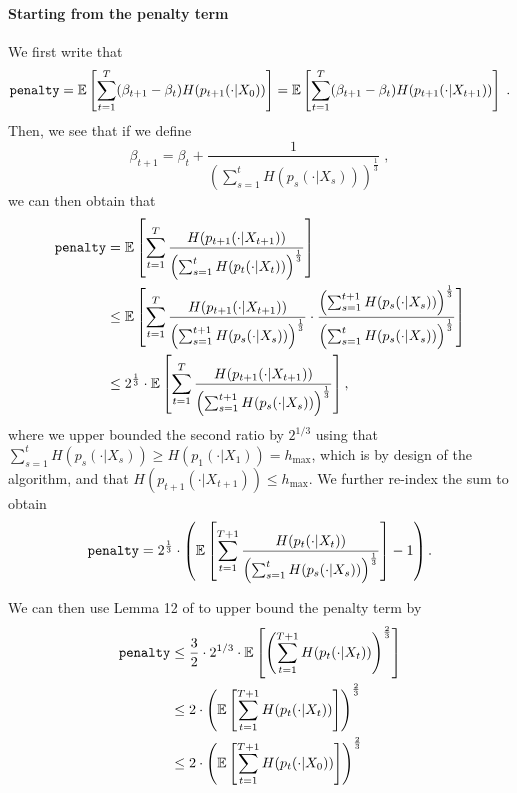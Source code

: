 \paragraph{Starting from the penalty term} We first write that 
\[ \texttt{penalty} =  \mathbb{E}\left[\sum_{t=1}^T (\beta_{t+1}-\beta_t) H(p_{t+1}(\cdot|X_0))\right] = \mathbb{E}\left[\sum_{t=1}^T (\beta_{t+1}-\beta_t) H(p_{t+1}(\cdot|X_{t+1}))\right] \;. \]
Then, we see that if we define
\[\beta_{t+1} = \beta_t + \frac{1}{\left(\sum_{s=1}^{t}H(p_s(\cdot|X_s))\right)^{\frac{1}{3}}} \;, \]
we can then obtain that 
\begin{align*}
\texttt{penalty} &= \mathbb{E}\left[\sum_{t=1}^T \frac{H(p_{t+1}(\cdot|X_{t+1}))}{\left(\sum_{s=1}^{t}H(p_t(\cdot|X_t))\right)^{\frac{1}{3}}}  \right]  \\
& \leq \mathbb{E}\left[\sum_{t=1}^T \frac{H(p_{t+1}(\cdot|X_{t+1}))}{\left(\sum_{s=1}^{t+1}H(p_s(\cdot|X_s))\right)^{\frac{1}{3}}} \cdot \frac{\left(\sum_{s=1}^{t+1}H(p_s(\cdot|X_s))\right)^{\frac{1}{3}}}{\left(\sum_{s=1}^{t}H(p_s(\cdot|X_s))\right)^{\frac{1}{3}}}  \right] \\
& \leq 2^\frac{1}{3} \cdot \mathbb{E}\left[\sum_{t=1}^T \frac{H(p_{t+1}(\cdot|X_{t+1}))}{\left(\sum_{s=1}^{t+1}H(p_s(\cdot|X_s))\right)^{\frac{1}{3}}}\right],  \\
\end{align*}
where we upper bounded the second ratio by $2^{1/3}$ using that $\sum_{s=1}^t H(p_s(\cdot|X_s))\geq H(p_1(\cdot|X_1))=h_{\max}$, which is by design of the algorithm, and that $H(p_{t+1}(\cdot|X_{t+1}))\leq h_{\max}$. We further re-index the sum to obtain 
\begin{align*}
\texttt{penalty} &=2^\frac{1}{3} \cdot \left(\mathbb{E}\left[\sum_{t=1}^{T+1} \frac{H(p_{t}(\cdot|X_{t}))}{\left(\sum_{s=1}^{t}H(p_s(\cdot|X_s))\right)^{\frac{1}{3}}}\right]-1\right). \\
\end{align*}

We can then use Lemma 12 of \cite{BOBWhardproblems} to upper bound the penalty term by 
\begin{align*}\texttt{penalty} &\leq  \frac{3}{2} \cdot 2^{1/3} \cdot \mathbb{E}\left[\left(\sum_{t=1}^{T+1}H(p_t(\cdot|X_t))\right)^{\frac{2}{3}} \right]  \\
	& \leq 2 \cdot \left(\mathbb{E}\left[\sum_{t=1}^{T+1}H(p_t(\cdot|X_t))\right]\right)^{\frac{2}{3}} \\
	& \leq 2 \cdot \left(\mathbb{E}\left[\sum_{t=1}^{T+1}H(p_t(\cdot|X_0))\right]\right)^{\frac{2}{3}} \\
\end{align*}



